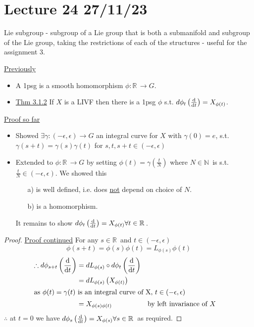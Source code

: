 \documentclass[12pt,a4paper]{article}
\newcommand{\nN}{\ensuremath{\mathbb{N}\,}}
\newcommand{\rR}{\ensuremath{\mathbb{R}\,}}
\newcommand{\dgq}[2]{\ensuremath{d {#1}_{#2}}}
\newcommand{\ul}[1]{\underline{#1}}
\begin{document}
\section{Lecture 24 27/11/23}
Lie subgroup - subgroup of a Lie group that is both a submanifold and subgroup of the Lie group, taking the restrictions of each of the structures - useful for the assignment 3.

\ul{Previously} 
\begin{itemize}
\item A 1psg is a smooth homomorphism $\phi:\rR\to G$.
\item \ul{Thm 3.1.2} If $X$ is a LIVF then there is a 1psg $\phi$ s.t. $\dgq{\phi}{t}\left(\dv{t}\right)=X_{\phi(t)}$.
\end{itemize}

\ul{Proof so far} 
\begin{itemize}
\item Showed $\exists \gamma :(-\epsilon,\epsilon)\to G$ an integral curve for $X$ with $\gamma(0)=e$, s.t. $\gamma(s+t)=\gamma(s)\gamma(t)$ for $s,t,s+t\in(-\epsilon,\epsilon)$
\item Extended to $\phi:\rR\to G$ by setting $\phi(t)=\gamma\left(\frac{t}{N}\right)$ where $N\in\nN$ is s.t. $\frac{t}{N}\in (-\epsilon,\epsilon)$.
We showed this 
\begin{itemize}
\item[a)] is well defined, i.e. does \ul{not} depend on choice of $N$.
\item[b)] is a homomorphism.
\end{itemize}
It remains to show $\dgq{\phi}{t}\left(\dv{t}\right)=X_{\phi(t)} \forall t\in \rR$.
\end{itemize}

\begin{proof}
\ul{Proof continued}
For any $s\in \rR$ and $t\in (-\epsilon,\epsilon)$
\[\phi(s+t)=\phi(s)\phi(t)=L_{\phi(s)}\phi(t)\]
\begin{align*}
\therefore \dgq{\phi}{s+t}\left(\dv{t}\right)&=\dgq{L}{\phi(s)}\circ \dgq{\phi}{t}\left(\dv{t}\right)\\
&=\dgq{L}{\phi(s)}\left(X_{\phi(t)}\right)\\
\shortintertext{as $\phi(t)=\gamma(t)$ is an integral curve of X, $t\in (-\epsilon,\epsilon)$}
&=X_{\phi(s)\phi(t)} &&\text{by left invariance of } X
\end{align*}
$\therefore$ at $t=0$ we have $\dgq{\phi}{s}\left(\dv{t}\right)=X_{\phi(s)} \forall s\in \rR$ as required.
\end{proof}
\end{document}
